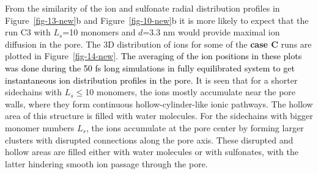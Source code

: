 \documentclass[3p,english,preprint]{elsarticle}
\newcommand{\need}[1]{\textcolor{black}{#1}}
\newcommand{\mage}[1]{\textcolor{black}{#1}}
\begin{document}
From the similarity of the ion and sulfonate radial 
distribution profiles in   
Figure~\ref{fig-13-new}b and 
Figure~\ref{fig-10-new}b  it is more likely to expect that  
the run C3 with $L_s$=10 monomers and $d$=3.3 nm would  provide maximal ion diffusion 
in the pore. The 3D distribution of ions for some of the {\bf case C} runs
are plotted in  Figure~\ref{fig-14-new}.
{\need{
 The averaging of the ion positions in these plots was done
during the 50 fs long simulations in fully equilibrated system to get
 instantaneous   ion distribution profiles in the pore.
}}
It is seen that for a shorter
sidechains with $L_s$$\leq$10 monomers, 
the ions mostly accumulate near the pore walls, where  
they form  continuous hollow-cylinder-like ionic pathways. The hollow 
area of this structure is filled with water molecules. 
For the sidechains with bigger monomer numbers $L_s$,  the ions accumulate at the pore center by forming  
larger clusters with disrupted connections along the pore axis. 
These disrupted and  hollow areas  are filled either 
with water molecules or with  sulfonates, with the  latter hindering
 smooth ion passage through the pore.
\end{document}
